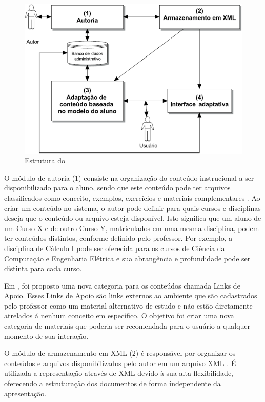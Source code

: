 \begin{figure}[htb]
  \caption{\label{fig:adaptweb-arquitetura}Estrutura do \adaptweb}
  \begin{center}
      \includegraphics[scale=1.0]{./Figuras/adaptweb-arquitetura.png}
  \end{center}
\end{figure}

O módulo de autoria (1) consiste na organização do conteúdo instrucional a ser disponibilizado para o aluno, sendo que
este conteúdo pode ter arquivos classificados como conceito, exemplos, exercícios e materiais complementares
\cite{gasparini2003interface}. Ao criar um conteúdo no sistema, o autor pode definir para quais cursos e disciplinas
deseja que o conteúdo ou arquivo esteja disponível. Isto significa que um aluno de um Curso X e de outro Curso Y,
matriculados em uma mesma disciplina, podem ter conteúdos distintos, conforme definido pelo professor. Por exemplo, a
disciplina de Cálculo I pode ser oferecida para os cursos de Ciência da Computação e Engenharia Elétrica e sua
abrangência e profundidade pode ser distinta para cada curso.

Em , foi proposto uma nova categoria para os conteúdos chamada Links de Apoio. Esses Links de Apoio
são links externos ao ambiente \adaptwebspace que são cadastrados pelo professor como um
material alternativo de estudo e não estão diretamente atrelados á nenhum conceito em específico. O objetivo foi criar
uma nova categoria de materiais que poderia ser recomendada para o usuário a qualquer momento de sua interação.

O módulo de armazenamento em XML (2) é responsável por organizar os conteúdos e arquivos disponibilizados pelo autor em
um arquivo XML \cite{gasparini2003interface}. É utilizada a representação através de XML devido à sua alta
flexibilidade, oferecendo a estruturação dos documentos de forma independente da apresentação.

